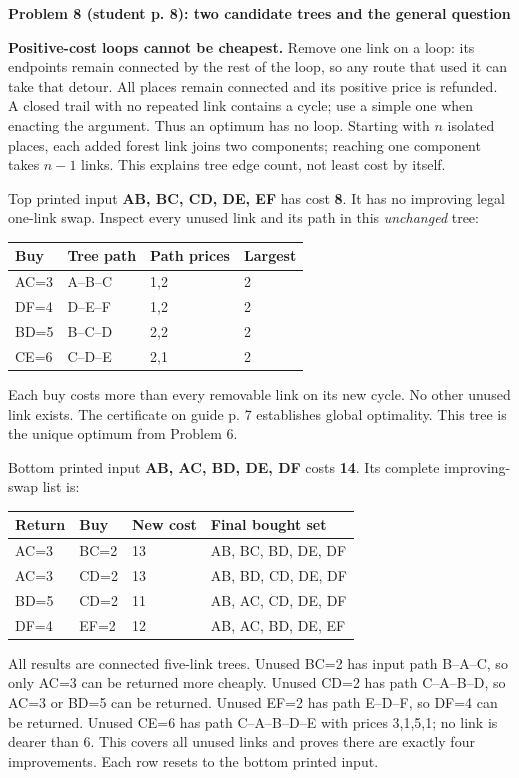 \documentclass[11pt,letterpaper]{article}
\newcommand\topic[1]{\par\vspace{5pt}{\large\bfseries #1}\par}
\newcommand\task[2]{\par\vspace{3pt}\textbf{Problem #1 (student p. #1): #2}\par}
\begin{document}
\topic{Loops and local tests: Problem 8}
\task{8}{two candidate trees and the general question}
\textbf{Positive-cost loops cannot be cheapest.} Remove one link on a loop: its endpoints remain connected by the rest of the loop, so any route that used it can take that detour. All places remain connected and its positive price is refunded. A closed trail with no repeated link contains a cycle; use a simple one when enacting the argument. Thus an optimum has no loop. Starting with $n$ isolated places, each added forest link joins two components; reaching one component takes $n-1$ links. This explains tree edge count, not least cost by itself.

Top printed input \textbf{AB, BC, CD, DE, EF} has cost \textbf{8}. It has no improving legal one-link swap. Inspect every unused link and its path in this \emph{unchanged} tree:
\begin{center}
\begin{tabular}{llll}
\toprule Buy & Tree path & Path prices & Largest\\\midrule
AC=3 & A--B--C & 1,2 & 2\\
DF=4 & D--E--F & 1,2 & 2\\
BD=5 & B--C--D & 2,2 & 2\\
CE=6 & C--D--E & 2,1 & 2\\\bottomrule
\end{tabular}
\end{center}
Each buy costs more than every removable link on its new cycle. No other unused link exists. The certificate on guide p. 7 establishes global optimality. This tree is the unique optimum from Problem 6.

Bottom printed input \textbf{AB, AC, BD, DE, DF} costs \textbf{14}. Its complete improving-swap list is:
\begin{center}\small
\begin{tabular}{llll}
\toprule Return & Buy & New cost & Final bought set\\\midrule
AC=3 & BC=2 & 13 & AB, BC, BD, DE, DF\\
AC=3 & CD=2 & 13 & AB, BD, CD, DE, DF\\
BD=5 & CD=2 & 11 & AB, AC, CD, DE, DF\\
DF=4 & EF=2 & 12 & AB, AC, BD, DE, EF\\\bottomrule
\end{tabular}
\end{center}
All results are connected five-link trees. Unused BC=2 has input path B--A--C, so only AC=3 can be returned more cheaply. Unused CD=2 has path C--A--B--D, so AC=3 or BD=5 can be returned. Unused EF=2 has path E--D--F, so DF=4 can be returned. Unused CE=6 has path C--A--B--D--E with prices 3,1,5,1; no link is dearer than 6. This covers all unused links and proves there are exactly four improvements. Each row resets to the bottom printed input.
\end{document}
